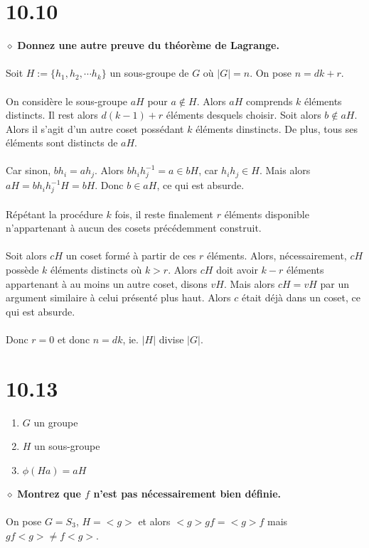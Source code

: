 \documentclass[a4paper,10pt]{article}
\begin{document}
\section*{10.10}
$\diamond$ \textbf{Donnez une autre preuve du théorème de Lagrange.}
\\
\\
Soit $H := \{h_1, h_2, \cdots h_k\}$ un sous-groupe de $G$ où $|G| = n$. On pose $n = dk + r$.
\\
\\
On considère le sous-groupe $aH$ pour $a \not \in H$. Alors $aH$ comprends $k$ éléments distincts. 
Il rest alors $d(k-1) + r$ éléments desquels choisir. Soit alors $b \not \in aH$. Alors il s'agit d'un autre
coset possédant $k$ éléments dinstincts. De plus, tous ses éléments sont distincts de $aH$.
\\
\\
Car sinon, $bh_i = ah_j$. Alors $bh_i h_j^{-1} = a \in bH$, car $h_i h_j \in H$. Mais alors $aH = b h_i h_j^{-1} H = bH$. Donc $b \in aH$, ce qui est absurde.
\\
\\
Répétant la procédure $k$ fois, il reste finalement $r$ éléments disponible n'appartenant à aucun des cosets précédemment construit. 
\\
\\
Soit alors $cH$ un coset formé à partir de ces $r$ éléments. Alors, nécessairement, $cH$ possède $k$ éléments distincts où $k > r$. Alors 
$cH$ doit avoir $k-r$ éléments appartenant à au moins un autre coset, disons $vH$. Mais alors $cH = vH$ par un argument similaire à 
celui présenté plus haut. Alors $c$ était déjà dans un coset, ce qui est absurde.
\\
\\
Donc $r = 0$ et donc $n = dk$, ie. $|H|$ divise $|G|$.

\section*{10.13}
\begin{enumerate}
 \item $G$ un groupe
 \item $H$ un sous-groupe
 \item $\phi(Ha) = aH$
\end{enumerate}
$\diamond$ \textbf{Montrez que $f$ n'est pas nécessairement bien définie.}
\\
\\
On pose $G = S_3$, $H = <g>$ et alors $<g>gf = <g>f$ mais $gf<g> \not = f<g>$.
\end{document}
